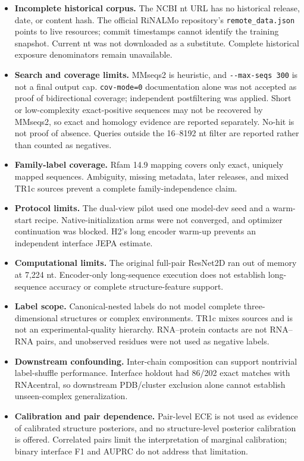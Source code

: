 \documentclass[
  11pt]{article}
\providecommand{\tightlist}{%
  \setlength{\itemsep}{0pt}\setlength{\parskip}{0pt}}
\begin{document}
\begin{itemize}
\tightlist
\item
  \textbf{Incomplete historical corpus.} The NCBI nt URL has no
  historical release, date, or content hash. The official RiNALMo
  repository's \texttt{remote\_data.json} points to live resources;
  commit timestamps cannot identify the training snapshot. Current nt
  was not downloaded as a substitute. Complete historical exposure
  denominators remain unavailable.
\item
  \textbf{Search and coverage limits.} MMseqs2 is heuristic, and
  \texttt{-\/-max-seqs\ 300} is not a final output cap.
  \texttt{cov-mode=0} documentation alone was not accepted as proof of
  bidirectional coverage; independent postfiltering was applied. Short
  or low-complexity exact-positive sequences may not be recovered by
  MMseqs2, so exact and homology evidence are reported separately.
  No-hit is not proof of absence. Queries outside the 16--8192 nt filter
  are reported rather than counted as negatives.
\item
  \textbf{Family-label coverage.} Rfam 14.9 mapping covers only exact,
  uniquely mapped sequences. Ambiguity, missing metadata, later
  releases, and mixed TR1c sources prevent a complete
  family-independence claim.
\item
  \textbf{Protocol limits.} The dual-view pilot used one model-dev seed
  and a warm-start recipe. Native-initialization arms were not
  converged, and optimizer continuation was blocked. H2's long encoder
  warm-up prevents an independent interface JEPA estimate.
\item
  \textbf{Computational limits.} The original full-pair ResNet2D ran out
  of memory at 7,224 nt. Encoder-only long-sequence execution does not
  establish long-sequence accuracy or complete structure-feature
  support.
\item
  \textbf{Label scope.} Canonical-nested labels do not model complete
  three-dimensional structures or complex environments. TR1c mixes
  sources and is not an experimental-quality hierarchy. RNA--protein
  contacts are not RNA--RNA pairs, and unobserved residues were not used
  as negative labels.
\item
  \textbf{Downstream confounding.} Inter-chain composition can support
  nontrivial label-shuffle performance. Interface holdout had 86/202
  exact matches with RNAcentral, so downstream PDB/cluster exclusion
  alone cannot establish unseen-complex generalization.
\item
  \textbf{Calibration and pair dependence.} Pair-level ECE is not used
  as evidence of calibrated structure posteriors, and no structure-level
  posterior calibration is offered. Correlated pairs limit the
  interpretation of marginal calibration; binary interface F1 and AUPRC
  do not address that limitation.
\end{itemize}
\end{document}
